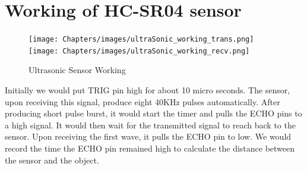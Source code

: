 \section{Working of HC-SR04 sensor}

\begin{figure}[hbt!]	
\begin{multicols}{2}{}{}
	\texttt{[image: Chapters/images/ultraSonic\_working\_trans.png]}\hspace{0.6cm}
	\texttt{[image: Chapters/images/ultraSonic\_working\_recv.png]}
	\caption{Ultrasonic Sensor Working}
\end{multicols}
\end{figure}
Initially we would put TRIG pin high for about 10 micro seconds. The sensor, upon receiving this signal, produce eight 40KHz pulses automatically. After producing short pulse burst, it would start the timer and pulls the ECHO pins to a high signal. It would then wait for the transmitted signal to reach back to the sensor. Upon receiving the first wave, it pulls the ECHO pin to low. We would record the time the ECHO pin remained high to calculate the distance between the sensor and the object.
\\
